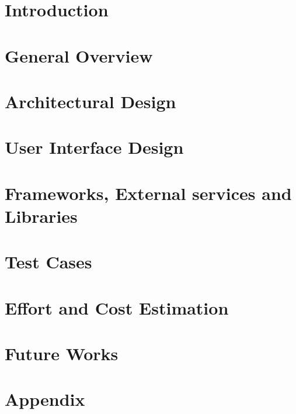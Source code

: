 \documentclass[a4paper,12pt]{report}
\begin{document}
\setcounter{tocdepth}{1}
\tableofcontents

\chapter{Introduction}

\clearpage

\chapter{General Overview}

\clearpage

\chapter{Architectural Design}

\clearpage

\chapter{User Interface Design}

\clearpage

\chapter{Frameworks, External services and Libraries}

\clearpage

\chapter{Test Cases}

\clearpage

\chapter{Effort and Cost Estimation}

\clearpage

\chapter{Future Works}

\clearpage

\appendix
\chapter{Appendix}

\clearpage
\end{document}
